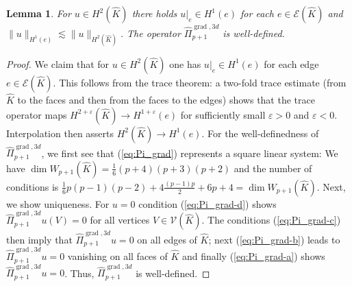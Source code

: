 \documentclass{article}
\newtheorem{lemma}[theorem]{Lemma}
\newcommand{\hatPigradcom}{\widehat\Pi^{\operatorname*{grad},3d}_{p+1}}
\begin{document}
\begin{lemma} 
\label{lemma:Pi_grad-well-defined}
For $u \in H^2(\widehat K)$ there holds 
$u|_e \in H^1(e)$ for each $e \in {\mathcal E}(\widehat K)$
and $\|u\|_{H^1(e)} \lesssim \|u\|_{H^2(\widehat K)}$. 
The operator $\hatPigradcom$ is well-defined. 
\end{lemma}
\begin{proof}
We claim that for $u \in H^2(\widehat K)$ one has $u|_e \in H^1(e)$ for 
each edge $e \in {\mathcal E}(\widehat K)$. 
This follows from the trace theorem: 
a two-fold trace estimate (from $\widehat K$ to the faces and then 
from the faces to the edges) shows that the trace operator maps
$H^{2+\varepsilon}(\widehat K)\rightarrow H^{1+\varepsilon}(e)$ 
for sufficiently small $\varepsilon > 0$ and $\varepsilon < 0$. 
Interpolation then asserts $H^2(\widehat K) \rightarrow H^1(e)$. 
For the well-definedness of $\hatPigradcom$, we first see that 
(\ref{eq:Pi_grad}) represents a square linear system: 
We have 
$\operatorname*{dim}W_{p+1}(\widehat{K})   =\frac{1}{6}(p+4)(p+3)(p+2)$
and the number of conditions is
$\frac{1}{6}p(p-1)(p-2)+4\frac{(p-1)p}
{2}+6p+4=\operatorname*{dim}W_{p+1}(\widehat{K}).$
Next, we show uniqueness. 
For $u = 0$ condition 
(\ref{eq:Pi_grad-d}) shows $\hatPigradcom u(V) = 0$ for all vertices $V \in {\mathcal V}(\widehat K)$. 
The conditions (\ref{eq:Pi_grad-c}) then imply that $\hatPigradcom u = 0$ on all edges of $\widehat K$; 
next (\ref{eq:Pi_grad-b}) leads to $\hatPigradcom u = 0$ vanishing on all faces of $\widehat K$ and finally 
(\ref{eq:Pi_grad-a}) shows $\hatPigradcom u = 0$. Thus, $\hatPigradcom$ is well-defined.
\end{proof}
\end{document}
